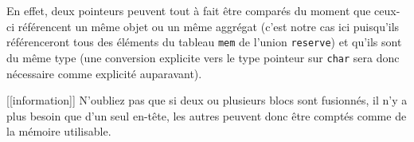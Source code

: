 \documentclass[]{article}
\begin{document}
En effet, deux pointeurs peuvent tout à fait être comparés du moment que
ceux-ci référencent un même objet ou un même aggrégat (c'est notre cas
ici puisqu'ils référenceront tous des éléments du tableau \texttt{mem}
de l'union \texttt{reserve}) et qu'ils sont du même type (une conversion
explicite vers le type pointeur sur \texttt{char} sera donc nécessaire
comme explicité auparavant).

{[}{[}information{]}{]} \textbar{} N'oubliez pas que si deux ou
plusieurs blocs sont fusionnés, il n'y a plus besoin que d'un seul
en-tête, les autres peuvent donc être comptés comme de la mémoire
utilisable.
\end{document}
